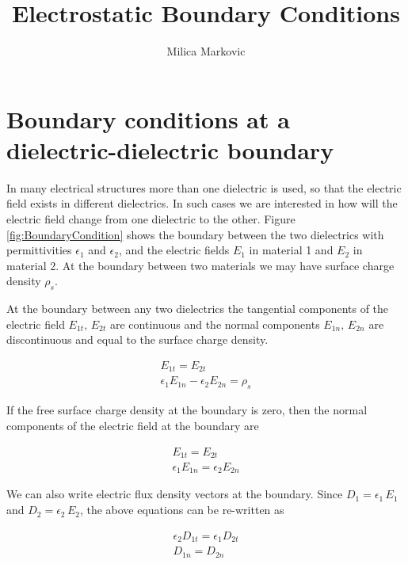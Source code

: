 \documentclass{ximera}
\title{Electrostatic Boundary Conditions}
\author{Milica Markovic}
\begin{document}
  
\begin{abstract}  

\end{abstract}  
\maketitle    


\section{Boundary conditions at a dielectric-dielectric boundary}



In many electrical structures more than one dielectric is used, so that the electric field exists in different dielectrics. In such cases we are interested in how will the electric field change from one dielectric to the other. Figure \ref{fig:BoundaryCondition} shows the boundary between the two dielectrics with permittivities $\epsilon_1$ and $\epsilon_2$, and the electric fields $E_1$ in material 1 and $E_2$ in material 2. At the boundary between two materials we may have surface charge density $\rho_s$.

At the boundary between any two  dielectrics the tangential components of the electric field $E_{1t}, \, E_{2t}$ are continuous and the normal components $E_{1n}, \, E_{2n}$ are discontinuous and equal to the surface charge density.  


\begin{eqnarray}
E_{1t}=E_{2t} \\
\epsilon_1 E_{1n}-\epsilon_2 E_{2n}=\rho_s 
\end{eqnarray} 

If the free surface charge density at the boundary is zero, then the normal components of the electric field at the boundary are


\begin{eqnarray}
E_{1t}=E_{2t} \\
\epsilon_1 E_{1n}=\epsilon_2 E_{2n}
\end{eqnarray} 


We can also write electric flux density vectors at the boundary. Since     
 $D_1=\epsilon_1 \,E_1$ and   $D_{2}=\epsilon_2 \,E_{2}$, the above equations can be re-written as


\begin{eqnarray}
\epsilon_2 D_{1t}=\epsilon_1 D_{2t}  \\
D_{1n}=D_{2n}
\end{eqnarray} 
\end{document}
